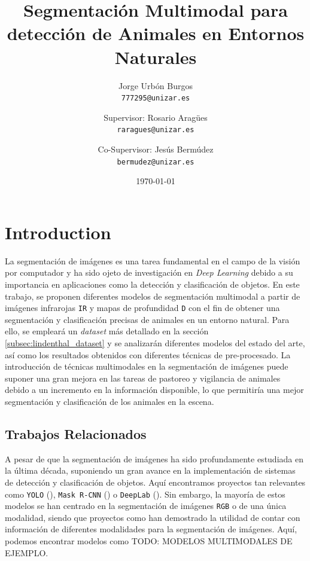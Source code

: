 \documentclass[12pt,a4paper]{report}
\title{Segmentación Multimodal para detección de Animales en Entornos Naturales}
\author{
    Jorge Urbón Burgos \\
    \texttt{777295@unizar.es}
    \and
    Supervisor: Rosario Aragües \\
    \texttt{raragues@unizar.es}
    \and
    Co-Supervisor: Jesús Bermúdez \\
    \texttt{bermudez@unizar.es}
}
\date{\today}
\begin{document}
\maketitle

\begin{abstract}
\end{abstract}

\tableofcontents

\chapter{Introduction}
\label{chap:introduction}
La segmentación de imágenes es una tarea fundamental en el campo de la visión por computador y ha sido ojeto de investigación en \textit{Deep Learning} debido a su importancia en aplicaciones como la detección y clasificación de objetos. En este trabajo, se proponen diferentes modelos de segmentación multimodal a partir de imágenes infrarojas \texttt{IR} y mapas de profundidad \texttt{D} con el fin de obtener una segmentación y clasificación precisas de animales en un entorno natural. Para ello, se empleará un \textit{dataset} más detallado en la sección \ref{subsec:lindenthal_dataset} y se analizarán diferentes modelos del estado del arte, así como los resultados obtenidos con diferentes técnicas de pre-procesado.
La introducción de técnicas multimodales en la segmentación de imágenes puede suponer una gran mejora en las tareas de pastoreo y vigilancia de animales debido a un incremento en la información disponible, lo que permitiría una mejor segmentación y clasificación de los animales en la escena.

\section{Trabajos Relacionados}
\label{sec:related_work}
A pesar de que la segmentación de imágenes ha sido profundamente estudiada en la última década, suponiendo un gran avance en la implementación de sistemas de detección y clasificación de objetos. Aquí encontramos proyectos tan relevantes como \texttt{YOLO} (\cite{YOLO!!!!!}), \texttt{Mask R-CNN} (\cite{maskrcnn}) o \texttt{DeepLab} (\cite{deeplab}). Sin embargo, la mayoría de estos modelos se han centrado en la segmentación de imágenes \texttt{RGB} o de una única modalidad, siendo que proyectos como \cite{MULTIMODALDEEJEMPLO} han demostrado la utilidad de contar con información de diferentes modalidades para la segmentación de imágenes. Aquí, podemos encontrar modelos como TODO: MODELOS MULTIMODALES DE EJEMPLO.
\end{document}
